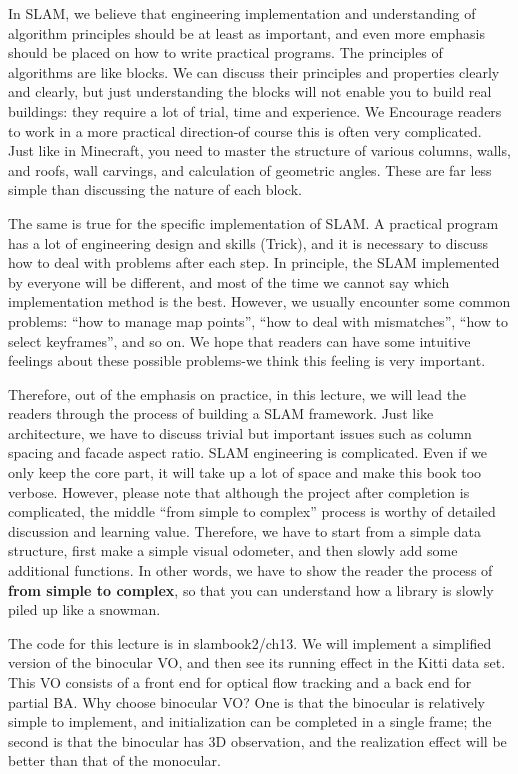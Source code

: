 In SLAM, we believe that engineering implementation and understanding of algorithm principles should be at least as important, and even more emphasis should be placed on how to write practical programs. The principles of algorithms are like blocks. We can discuss their principles and properties clearly and clearly, but just understanding the blocks will not enable you to build real buildings: they require a lot of trial, time and experience. We Encourage readers to work in a more practical direction-of course this is often very complicated. Just like in Minecraft, you need to master the structure of various columns, walls, and roofs, wall carvings, and calculation of geometric angles. These are far less simple than discussing the nature of each block.

The same is true for the specific implementation of SLAM. A practical program has a lot of engineering design and skills (Trick), and it is necessary to discuss how to deal with problems after each step. In principle, the SLAM implemented by everyone will be different, and most of the time we cannot say which implementation method is the best. However, we usually encounter some common problems: ``how to manage map points'', ``how to deal with mismatches'', ``how to select keyframes'', and so on. We hope that readers can have some intuitive feelings about these possible problems-we think this feeling is very important.

Therefore, out of the emphasis on practice, in this lecture, we will lead the readers through the process of building a SLAM framework. Just like architecture, we have to discuss trivial but important issues such as column spacing and facade aspect ratio. SLAM engineering is complicated. Even if we only keep the core part, it will take up a lot of space and make this book too verbose. However, please note that although the project after completion is complicated, the middle ``from simple to complex'' process is worthy of detailed discussion and learning value. Therefore, we have to start from a simple data structure, first make a simple visual odometer, and then slowly add some additional functions. In other words, we have to show the reader the process of \textbf{from simple to complex}, so that you can understand how a library is slowly piled up like a snowman.

The code for this lecture is in slambook2/ch13. We will implement a simplified version of the binocular VO, and then see its running effect in the Kitti data set. This VO consists of a front end for optical flow tracking and a back end for partial BA. Why choose binocular VO? One is that the binocular is relatively simple to implement, and initialization can be completed in a single frame; the second is that the binocular has 3D observation, and the realization effect will be better than that of the monocular.

